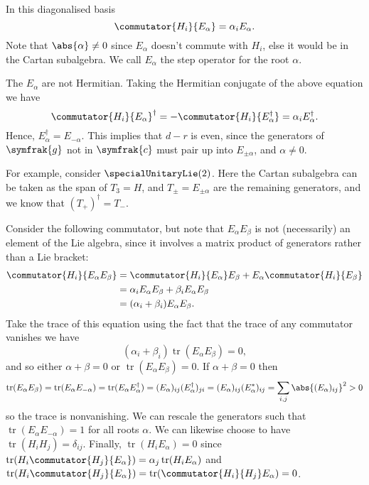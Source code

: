 \documentclass[fleqn]{NotesClass}
\renewcommand{\lie}[1]{\symfrak{#1}}
\newcommand{\hermit}{\dagger}
\DeclareMathOperator{\tr}{tr}
\begin{document}
    In this diagonalised basis
    \begin{equation}
        \commutator{H_i}{E_\alpha} = \alpha_i E_\alpha.
    \end{equation}
    Note that \(\abs{\alpha} \ne 0\) since \(E_\alpha\) doesn't commute with \(H_i\), else it would be in the Cartan subalgebra.
    We call \(E_\alpha\) the step operator for the root \(\alpha\).
    
    The \(E_\alpha\) are not Hermitian.
    Taking the Hermitian conjugate of the above equation we have
    \begin{equation}
        \commutator{H_i}{E_\alpha}^\hermit = -\commutator{H_i}{E_\alpha^\hermit} = \alpha_iE_\alpha^\hermit.
    \end{equation}
    Hence, \(E_\alpha^\hermit = E_{-\alpha}\).
    This implies that \(d - r\) is even, since the generators of \(\lie{g}\) not in \(\lie{c}\) must pair up into \(E_{\pm \alpha}\), and \(\alpha \ne 0\).
    
    For example, consider \(\specialUnitaryLie(2)\).
    Here the Cartan subalgebra can be taken as the span of \(T_3 = H\), and \(T_{\pm} = E_{\pm \alpha}\) are the remaining generators, and we know that \((T_+)^\hermit = T_-\).
    
    Consider the following commutator, but note that \(E_\alpha E_\beta\) is not (necessarily) an element of the Lie algebra, since it involves a matrix product of generators rather than a Lie bracket:
    \begin{align}
        \commutator{H_i}{E_\alpha E_\beta} &= \commutator{H_i}{E_\alpha}E_\beta + E_\alpha \commutator{H_i}{E_\beta}\\
        &= \alpha_i E_\alpha E_\beta + \beta_i E_\alpha E_\beta\\
        &= (\alpha_i + \beta_i) E_\alpha E_\beta.
    \end{align}
    Take the trace of this equation using the fact that the trace of any commutator vanishes we have
    \begin{equation}
        (\alpha_i + \beta_i)\tr(E_\alpha E_\beta) = 0,
    \end{equation}
    and so either \(\alpha + \beta = 0\) or \(\tr(E_\alpha E_\beta) = 0\).
    If \(\alpha + \beta = 0\) then
    \begin{equation*}
        \tr(E_\alpha E_\beta) = \tr(E_\alpha E_{-\alpha}) = \tr(E_\alpha E_\alpha^\hermit) = (E_\alpha)_{ij} (E_\alpha^\hermit)_{ji} = (E_\alpha)_{ij}(E_\alpha^*)_{ij} = \sum_{i,j} \abs{(E_\alpha)_{ij}}^2 > 0
    \end{equation*}
    so the trace is nonvanishing.
    We can rescale the generators such that \(\tr(E_\alpha E_{-\alpha}) = 1\) for all roots \(\alpha\).
    We can likewise choose to have \(\tr(H_iH_j) = \delta_{ij}\).
    Finally, \(\tr(H_i E_\alpha) = 0\) since \(\tr(H_i\commutator{H_j}{E_\alpha}) = \alpha_j\tr(H_iE_\alpha)\) and \(\tr(H_i\commutator{H_j}{E_\alpha}) = \tr(\commutator{H_i}{H_j}E_\alpha) = 0\).
    
\end{document}
